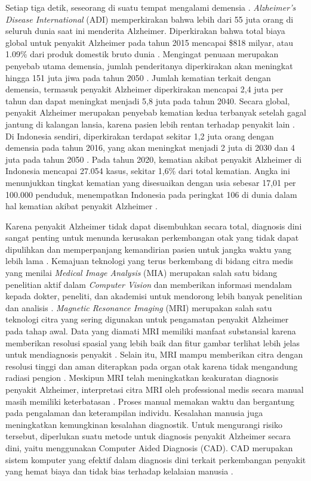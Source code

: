     Setiap tiga detik, seseorang di suatu tempat mengalami demensia \autocite{Long2024}. \textit{Alzheimer's Disease International} (ADI) memperkirakan bahwa lebih dari 55 juta orang di seluruh dunia saat ini menderita Alzheimer. Diperkirakan bahwa total biaya global untuk penyakit Alzheimer pada tahun 2015 mencapai \$818 milyar, atau 1.09\% dari produk domestik bruto dunia \autocite{AlzheimersDiseaseInternational2022}. Mengingat penuaan merupakan penyebab utama demensia, jumlah penderitanya diperkirakan akan meningkat hingga 151 juta jiwa pada tahun 2050 \autocite{Prince2015}. Jumlah kematian terkait dengan demensia, termasuk penyakit Alzheimer diperkirakan mencapai 2,4 juta per tahun dan dapat meningkat menjadi 5,8 juta pada tahun 2040. Secara global, penyakit Alzheimer merupakan penyebab kematian kedua terbanyak setelah gagal jantung di kalangan lansia, karena pasien lebih rentan terhadap penyakit lain \autocite{Breijyeh2021,Liang2021}. Di Indonesia sendiri, diperkirakan terdapat sekitar 1,2 juta orang dengan demensia pada tahun 2016, yang akan meningkat menjadi 2 juta di 2030 dan 4 juta pada tahun 2050 \autocite{AlzheimersIndonesia2019}. Pada tahun 2020, kematian akibat penyakit Alzheimer di Indonesia mencapai 27.054 kasus, sekitar 1,6\% dari total kematian. Angka ini menunjukkan tingkat kematian yang disesuaikan dengan usia sebesar 17,01 per 100.000 penduduk, menempatkan Indonesia pada peringkat 106 di dunia dalam hal kematian akibat penyakit Alzheimer \autocite{WebAlzheimerDementia}. 

    Karena penyakit Alzheimer tidak dapat disembuhkan secara total, diagnosis dini sangat penting untuk menunda kerusakan perkembangan otak yang tidak dapat dipulihkan dan memperpanjang kemandirian pasien untuk jangka waktu yang lebih lama \autocite{Shamrat2023}. Kemajuan teknologi yang terus berkembang di bidang citra medis yang menilai \textit{Medical Image Analysis} (MIA) merupakan salah satu bidang penelitian aktif dalam \textit{Computer Vision} dan memberikan informasi mendalam kepada dokter, peneliti, dan akademisi untuk mendorong lebih banyak penelitian dan analisis \autocite{McKhann2012}. \textit{Magnetic Resonance Imaging} (MRI) merupakan salah satu teknologi citra yang sering digunakan untuk pengamatan penyakit Alzheimer pada tahap awal. Data yang diamati MRI memiliki manfaat substansial karena memberikan resolusi spasial yang lebih baik dan fitur gambar terlihat lebih jelas untuk mendiagnosis penyakit \autocite{El-Assy2024}. Selain itu, MRI mampu memberikan citra dengan resolusi tinggi dan aman diterapkan pada organ otak karena tidak mengandung radiasi pengion \autocite{CitraR2024}. Meskipun MRI telah meningkatkan keakuratan diagnosis penyakit Alzheimer, interpretasi citra MRI oleh professional medis secara manual masih memiliki keterbatasan \autocite{Ismail2024}. Proses manual memakan waktu dan bergantung pada pengalaman dan keterampilan individu. Kesalahan manusia juga meningkatkan kemungkinan kesalahan diagnostik. Untuk mengurangi risiko tersebut, diperlukan suatu metode untuk diagnosis penyakit Alzheimer secara dini, yaitu menggunakan Computer Aided Diagnosis (CAD). CAD merupakan sistem komputer yang efektif dalam diagnosis dini terkait perkembangan penyakit yang hemat biaya dan tidak bias terhadap kelalaian manusia \autocite{Lazli2019}.

